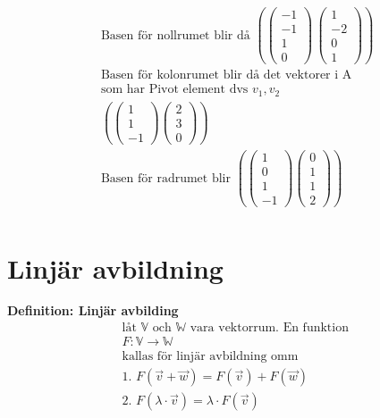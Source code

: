 \begin{multicols}{2}
\begin{align*}
  &\text{Basen för nollrumet blir då }
  \left( \begin{pmatrix} -1 \\ -1 \\ 1 \\ 0 \end{pmatrix} \, \begin{pmatrix} 1 \\ -2 \\ 0 \\ 1 \end{pmatrix} \right)  \\
  &\text{Basen för kolonrumet blir då det vektorer i A} \\
  &\text{som har Pivot element dvs } v_1, v_2 \\
  &\left( \begin{pmatrix} 1 \\ 1 \\ -1 \end{pmatrix} \begin{pmatrix} 2 \\ 3 \\ 0 \end{pmatrix} \right) \\
  &\text{Basen för radrumet blir }
  \left( \begin{pmatrix} 1 \\ 0 \\ 1 \\ -1 \end{pmatrix} \begin{pmatrix} 0 \\ 1 \\ 1 \\ 2 \end{pmatrix} \right) \\
\end{align*}


\section{Linjär avbildning}
\textbf{Definition: Linjär avbilding}
\begin{align*}
  &\text{låt $\mathbb{V}$ och $\mathbb{W}$ vara vektorrum. En funktion } \\
  &F:\mathbb{V}\to\mathbb{W} \\
  &\text{kallas för linjär avbildning omm} \\
  &\text{1. } F(\vec{v}+\vec{w}) = F(\vec{v}) + F(\vec{w}) \\
  &\text{2. } F(\lambda\cdot\vec{v}) = \lambda\cdot F(\vec{v}) \\
\end{align*}


\end{multicols}
